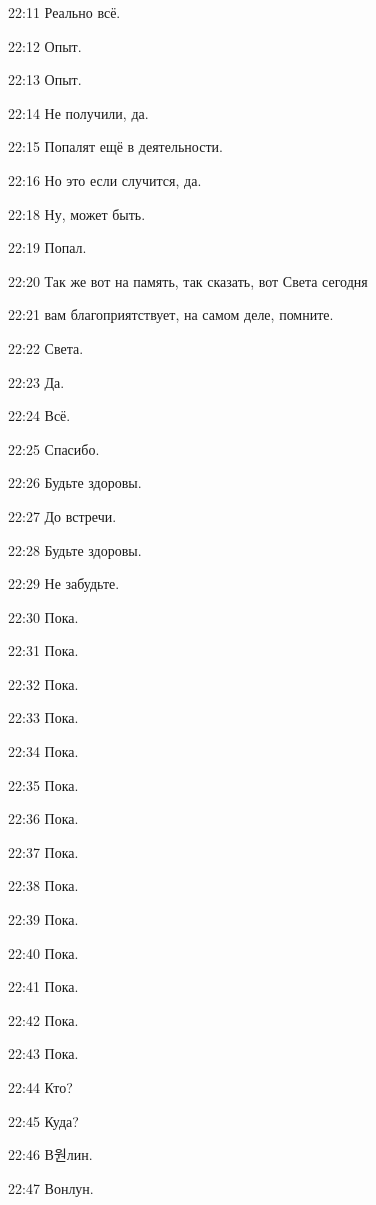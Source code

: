 22:11
Реально всё.

22:12
Опыт.

22:13
Опыт.

22:14
Не получили, да.

22:15
Попалят ещё в деятельности.

22:16
Но это если случится, да.

22:18
Ну, может быть.

22:19
Попал.

22:20
Так же вот на память, так сказать, вот Света сегодня

22:21
вам благоприятствует, на самом деле, помните.

22:22
Света.

22:23
Да.

22:24
Всё.

22:25
Спасибо.

22:26
Будьте здоровы.

22:27
До встречи.

22:28
Будьте здоровы.

22:29
Не забудьте.

22:30
Пока.

22:31
Пока.

22:32
Пока.

22:33
Пока.

22:34
Пока.

22:35
Пока.

22:36
Пока.

22:37
Пока.

22:38
Пока.

22:39
Пока.

22:40
Пока.

22:41
Пока.

22:42
Пока.

22:43
Пока.

22:44
Кто?

22:45
Куда?

22:46
В원лин.

22:47
Вонлун.
